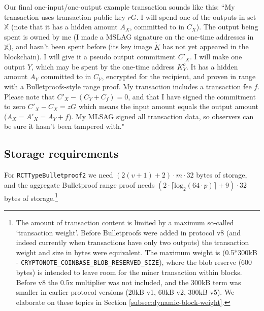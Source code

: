 Our final one-input/one-output example transaction sounds like this: ``My transaction uses transaction public key $r G$. I will spend one of the outputs in set $\mathbb{X}$ (note that it has a hidden amount $A_X$, committed to in $C_X$). The output being spent is owned by me (I made a MSLAG signature on the one-time addresses in $\mathbb{X}$), and hasn't been spent before (its key image $\tilde{K}$ has not yet appeared in the blockchain). I will give it a pseudo output commitment $C'_X$. I will make one output $Y$, which may be spent by the one-time address $K^o_Y$. It has a hidden amount $A_Y$ committed to in $C_Y$, encrypted for the recipient, and proven in range with a Bulletproofs-style range proof. My transaction includes a transaction fee $f$. Please note that $C'_X - (C_Y + C_f) = 0$, and that I have signed the commitment to zero $C'_X - C_X = z G$ which means the input amount equals the output amount ($A_X = A'_X = A_Y + f$). My MLSAG signed all transaction data, so observers can be sure it hasn't been tampered with."


\newpage
\subsection{Storage requirements}

For {\tt RCTTypeBulletproof2} we need $(2(v+1)+2) \cdot m \cdot 32$ bytes of storage, and the aggregate Bulletproof range proof needs $(2 \cdot \lceil \textrm{log}_2(64 \cdot p) \rceil + 9) \cdot 32$ bytes of storage.\footnote{The amount of transaction content is limited by a maximum so-called `transaction weight'. Before Bulletproofs were added in protocol v8 (and indeed currently when transactions have only two outputs) the transaction weight and size in bytes were equivalent. The maximum weight is (0.5*300kB - {\tt CRYPTONOTE\_COINBASE\_BLOB\_RESERVED\_SIZE}), where the blob reserve (600 bytes) is intended to leave room for the miner transaction within blocks. Before v8 the 0.5x multiplier was not included, and the 300kB term was smaller in earlier protocol versions (20kB v1, 60kB v2, 300kB v5). We elaborate on these topics in Section \ref{subsec:dynamic-block-weight}.}

